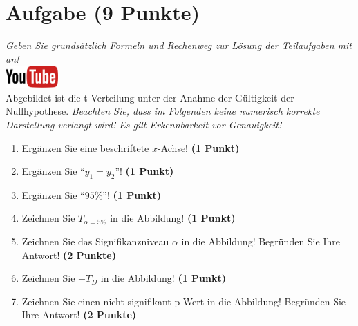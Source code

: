 \documentclass[a4paper, 9pt]{scrartcl}\usepackage[]{graphicx}\usepackage[]{xcolor}
\begin{document}
 
\clearpage

\section{Aufgabe \hfill (9 Punkte)}

\textit{Geben Sie grunds{\"a}tzlich Formeln und Rechenweg zur L{\"o}sung der
  Teilaufgaben mit an!} \\[1Ex]

\hfill\href{https://youtu.be/32JjH1eyuTU}{\includegraphics[width =
  2cm]{img/youtube}}\\[1Ex]



Abgebildet ist die t-Verteilung unter der Anahme der G{\"u}ltigkeit der
Nullhypothese. \textit{Beachten Sie, dass im Folgenden keine
  numerisch korrekte Darstellung verlangt wird! Es gilt Erkennbarkeit vor
  Genauigkeit!}

\begin{enumerate}
\item Erg{\"a}nzen Sie eine beschriftete $x$-Achse! \textbf{(1 Punkt)}
\item Erg{\"a}nzen Sie "`$\bar{y}_1 = \bar{y}_2$"'! \textbf{(1 Punkt)} 
\item Erg{\"a}nzen Sie "`$95\%$"'! \textbf{(1 Punkt)}
\item Zeichnen Sie $T_{\alpha=5\%}$ in die Abbildung! \textbf{(1 Punkt)} 
\item Zeichnen Sie das Signifikanzniveau $\alpha$ in die Abbildung! Begr{\"u}nden
  Sie Ihre Antwort! \textbf{(2 Punkte)} 
\item Zeichnen Sie $-T_{D}$ in die Abbildung! \textbf{(1
    Punkt)}
\item Zeichnen Sie einen nicht signifikant p-Wert in die Abbildung! Begr{\"u}nden
  Sie Ihre Antwort! \textbf{(2 Punkte)}   
\end{enumerate}
\end{document}
